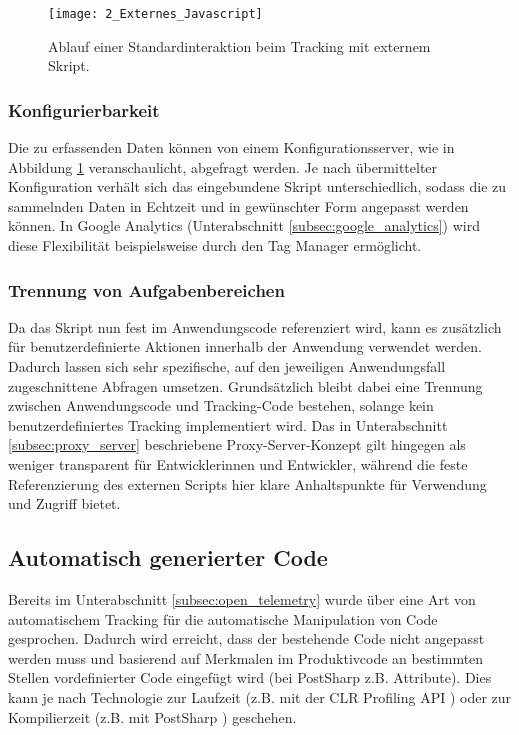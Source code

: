 \begin{figure}[H]
\centering
\texttt{[image: 2\_Externes\_Javascript]}
\caption{Ablauf einer Standardinteraktion beim Tracking mit externem Skript.}
\label{fig:external_javascript}
\end{figure}

\subsubsection{Konfigurierbarkeit}
Die zu erfassenden Daten können von einem Konfigurationsserver, wie in Abbildung \ref{fig:external_javascript} veranschaulicht, abgefragt werden. Je nach übermittelter Konfiguration verhält sich das eingebundene Skript unterschiedlich, sodass die zu sammelnden Daten in Echtzeit und in gewünschter Form angepasst werden können. In Google Analytics (Unterabschnitt \ref{subsec:google_analytics}) wird diese Flexibilität beispielsweise durch den Tag Manager ermöglicht.

\subsubsection{Trennung von Aufgabenbereichen}
Da das Skript nun fest im Anwendungscode referenziert wird, kann es zusätzlich für benutzerdefinierte Aktionen innerhalb der Anwendung verwendet werden. Dadurch lassen sich sehr spezifische, auf den jeweiligen Anwendungsfall zugeschnittene Abfragen umsetzen. Grundsätzlich bleibt dabei eine Trennung zwischen Anwendungscode und Tracking-Code bestehen, solange kein benutzerdefiniertes Tracking implementiert wird.  
Das in Unterabschnitt \ref{subsec:proxy_server} beschriebene Proxy-Server-Konzept gilt hingegen als weniger transparent für Entwicklerinnen und Entwickler, während die feste Referenzierung des externen Scripts hier klare Anhaltspunkte für Verwendung und Zugriff bietet.

\subsection{Automatisch generierter Code}
\label{subsec:autogenerated_code}
Bereits im Unterabschnitt \ref{subsec:open_telemetry} wurde über eine Art von automatischem Tracking für die automatische Manipulation von Code gesprochen. Dadurch wird erreicht, dass der bestehende Code nicht angepasst werden muss und basierend auf Merkmalen im Produktivcode an bestimmten Stellen vordefinierter Code eingefügt wird (bei PostSharp z.B. Attribute). Dies kann je nach Technologie zur Laufzeit (z.B. mit der CLR Profiling API \cite{microsoft2025profiling}) oder zur Kompilierzeit (z.B. mit PostSharp \cite{postsharp-how-it-works}) geschehen.

